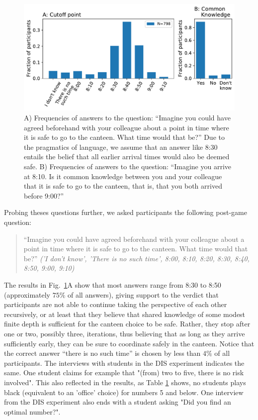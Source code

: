 \documentclass[twocolumn,a4paper,superscriptaddress,nofootinbib]{revtex4}
\begin{document}
\begin{figure} %
\centering\includegraphics[width=1\linewidth]{fig6_cutoff}
\caption{A) Frequencies of answers to the question: ``Imagine you could have agreed beforehand with your colleague about a point in time where it is safe to go to the canteen. What time would that be?'' Due to the pragmatics of language, we assume that an answer like 8:30 entails the belief that all earlier arrival times would also be deemed safe. B) Frequencies of answers to the question: ``Imagine you arrive at 8:10. Is it common knowledge between you and your colleague that it is safe to go to the canteen, that is, that you both arrived before 9:00?''}
\label{fig:5} %
\end{figure}
Probing theses questions further, we asked participants the following post-game question:
\begin{quote}
\indent
``Imagine you could have agreed beforehand with your colleague about a point in time where it is safe to go to the canteen. What time would that be?'' \textit{('I don't know', 'There is no such time', 8:00, 8:10, 8:20, 8:30, 8:40, 8:50, 9:00, 9:10)}
\end{quote}
The results in Fig.~\ref{fig:5}A show that most answers range from 8:30 to 8:50 (approximately $75\%$ of all answers), giving support to the verdict that participants are not able to continue taking the perspective of each other recursively, or at least that they believe that shared knowledge of some modest finite depth is sufficient for the canteen choice to be safe. Rather, they stop after one or two, possibly three, iterations, thus believing that as long as they arrive sufficiently early, they can be sure to coordinate safely in the canteen. Notice that the correct answer ``there is no such time'' is chosen by less than $4\%$ of all participants. The interviews with students in the DIS experiment indicates the same. One student claims for example that "(from) two to five, there is no risk involved". This also reflected in the results, as Table \ref{fig:5} shows, no students plays black (equivalent to an 'office' choice) for numbers 5 and below. One interview from the DIS experiment also ends with a student asking "Did you find an optimal number?". 
\end{document}
